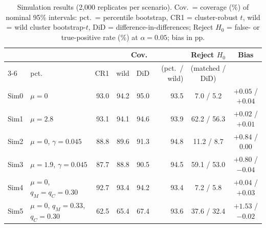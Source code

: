 \documentclass[runningheads]{llncs}
\begin{document}
\begin{table}[!tb]
\caption{Simulation results (2,000 replicates per scenario). Cov.\ = coverage (\%) of nominal 95\% intervals: pct.\ = percentile bootstrap, CR1 = cluster-robust $t$, wild = wild cluster bootstrap-$t$, DiD = difference-in-differences; Reject $H_0$ = false- or true-positive rate (\%) at $\alpha = 0.05$; bias in pp.}\label{tab:sim}
\centering\footnotesize
\setlength{\tabcolsep}{3.2pt}
\begin{tabular}{@{}l@{\hspace{4pt}}lrrrrcc@{}}
\toprule
 & & \multicolumn{4}{c}{Cov.} & Reject $H_0$ & Bias \\
\cmidrule(lr){3-6}
\multicolumn{2}{@{}l}{Scenario} & pct. & CR1 & wild & DiD & (pct.\ / wild) & (matched / DiD) \\
\midrule
Sim0 & $\mu = 0$ & 93.0 & 94.2 & 95.0 & 93.5 & 7.0 / 5.2 & $+0.05$ / $+0.04$ \\
Sim1 & $\mu = 2.8$ & 93.1 & 94.1 & 94.6 & 93.9 & 62.2 / 56.3 & $+0.02$ / $+0.01$ \\
Sim2 & $\mu = 0$, $\gamma = 0.045$ & 88.8 & 89.6 & 91.3 & 94.8 & 11.2 / 8.7 & $+0.84$ / 0.00 \\
Sim3 & $\mu = 1.9$, $\gamma = 0.045$ & 87.7 & 88.8 & 90.5 & 94.5 & 59.1 / 53.0 & $+0.80$ / $-0.04$ \\
Sim4 & $\mu = 0$, $q_M = q_C = 0.30$ & 92.7 & 93.4 & 94.2 & 93.4 & 7.2 / 5.8 & $+0.04$ / $+0.03$ \\
Sim5 & $\mu = 0$, $q_M = 0.33$, $q_C = 0.30$ & 62.5 & 65.4 & 67.4 & 93.6 & 37.6 / 32.4 & $+1.53$ / $-0.02$ \\
\bottomrule
\end{tabular}
\end{table}
\end{document}

